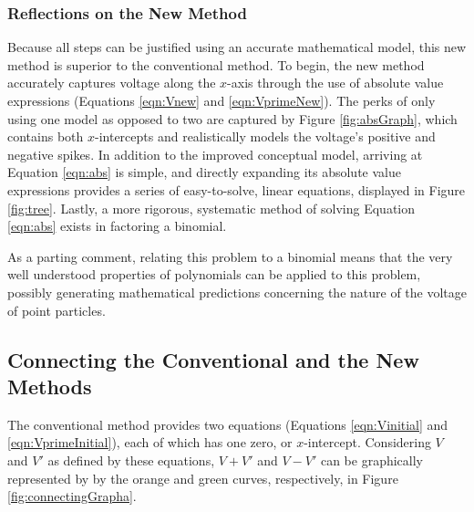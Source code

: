 \documentclass[titlepage]{article}
\begin{document}
\subsubsection*{Reflections on the New Method}
Because all steps can be justified using an accurate mathematical model, this new method is superior to the conventional method. To begin, the new method accurately captures voltage along the $x$-axis through the use of absolute value expressions (Equations \ref{eqn:Vnew} and \ref{eqn:VprimeNew}). The perks of only using one model as opposed to two are captured by Figure \ref{fig:absGraph}, which contains both $x$-intercepts and realistically models the voltage's positive and negative spikes. In addition to the improved conceptual model, arriving at Equation \ref{eqn:abs} is simple, and directly expanding its absolute value expressions provides a series of easy-to-solve, linear equations, displayed in Figure \ref{fig:tree}. Lastly, a more rigorous, systematic method of solving Equation \ref{eqn:abs} exists in factoring a binomial.\par
As a parting comment, relating this problem to a binomial means that the very well understood properties of polynomials can be applied to this problem, possibly generating mathematical predictions concerning the nature of the voltage of point particles.


\subsection*{Connecting the Conventional and the New Methods}
The conventional method provides two equations (Equations \ref{eqn:Vinitial} and \ref{eqn:VprimeInitial}), each of which has one zero, or $x$-intercept. Considering $V$ and $V'$ as defined by these equations, $V+V'$ and $V-V'$ can be graphically represented by by the orange and green curves, respectively, in Figure \ref{fig:connectingGrapha}.
\end{document}
